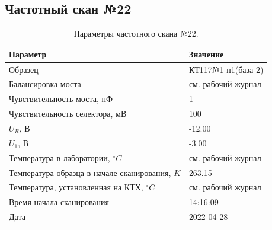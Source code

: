 \subsection{Частотный скан №22}
\begin{table}[!ht]
    \centering
    \caption{Параметры частотного скана №22.}
    \begin{tabular}{|l|l|}
        \hline
        Параметр                                       & Значение                  \\ \hline
        Образец                                        & КТ117№1 п1(база 2)        \\ \hline
        Балансировка моста                             & см. рабочий журнал        \\ \hline
        Чувствительность моста, пФ                     & 1                         \\ \hline
        Чувствительность селектора, мВ                 & 100                       \\ \hline
        $U_R$, В                                       & -12.00                    \\ \hline
        $U_1$, В                                       & -3.00                     \\ \hline
        Температура в лаборатории, $^\circ C$          & см. рабочий журнал        \\ \hline
        Температура образца в начале сканирования, $K$ & 263.15                    \\ \hline
        Температура, установленная на КТХ, $^\circ C$  & см. рабочий журнал        \\ \hline
        Время начала сканирования                      & 14:16:09                  \\ \hline
        Дата                                           & 2022-04-28                \\ \hline
    \end{tabular}
    \label{table:frequency_scan_22}
\end{table}

